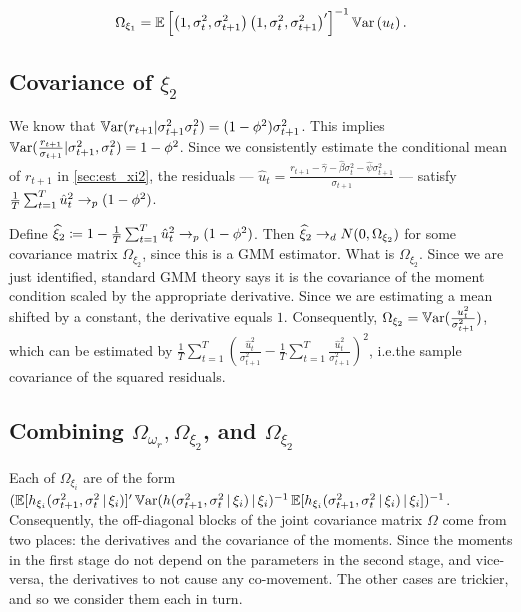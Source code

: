 \documentclass[11pt, letterpaper, twoside]{article}
\begin{document}
\begin{equation}
  \Omega_{\xi_1} = \operatorname{\mathbb{E}}\left[\left(1, \sigma^2_{t}, \sigma^2_{t+1}\right) \left(1, \sigma^2_{t},
  \sigma^2_{t+1}\right)'\right]^{-1} \operatorname{\mathbb{V}ar}\left(u_t\right).
\end{equation}


\subsection[Covariance Computation Step 3]{Covariance of $\xi_2$}

We know that $\operatorname{\mathbb{V}ar}(r_{t+1} \vert \sigma^2_{t+1} \sigma^2_t) = (1-\phi^2) \sigma^2_{t+1}$.
This implies $\operatorname{\mathbb{V}ar}(\frac{r_{t+1}}{\sigma_{t+1}} \vert \sigma^2_{t+1}, \sigma^2_t) = 1 - \phi^2$.
Since we consistently estimate the conditional mean of $r_{t+1}$ in \cref{sec:est_xi2}, the residuals ---
$\widehat{u}_t = \frac{r_{t+1} - \widehat{\gamma} - \widehat{\beta}\sigma^2_t - \widehat{\psi}
\sigma^2_{t+1}}{\sigma_{t+1}}$ --- satisfy $\frac{1}{T} \sum_{t=1}^T \hat{u}_t^2 \to_p (1 - \phi^2)$.

Define $\widehat{\xi}_2 \coloneqq 1 - \frac{1}{T} \sum_{t=1}^T \hat{u}_t^2 \to_p (1 - \phi^2)$.
Then $\widehat{\xi}_2 \to_d N(0, \Omega_{\xi_2})$ for some covariance matrix $\Omega_{\xi_2}$, since this is a GMM
estimator.
What is $\Omega_{\xi_2}$.
Since we are just identified, standard GMM theory says it is the covariance of the moment condition scaled by the
appropriate derivative. 
Since we are estimating a mean shifted by a constant, the derivative equals $1$.
Consequently, $\Omega_{\xi_2} = \operatorname{\mathbb{V}ar}(\frac{u^2_t}{\sigma^2_{t+1}})$, which can be estimated by
$\frac{1}{T} \sum_{t=1}^T (\frac{\widehat{u}_t^2}{\sigma^2_{t+1}} - \frac{1}{T} \sum_{t=1}^T
\frac{\widehat{u}_t^2}{\sigma^2_{t+1}})^2$, i.e.\@ the sample covariance of the squared residuals. 

\subsection[Combining the Covariance Matrices]{Combining $\Omega_{\omega_r}, \Omega_{\xi_2}$, and $\Omega_{\xi_2}$}

Each of $\Omega_{\xi_i}$ are of the form $(\operatorname{\mathbb{E}}[h_{\xi_{i}}(\sigma^2_{t+1}, \sigma^2_t \,\vert\, \xi_i)]' \operatorname{\mathbb{V}ar}(h(\sigma^2_{t+1}, \sigma^2_t \,\vert\, \xi_i) \,\vert\, \xi_i)^{-1} \operatorname{\mathbb{E}}[h_{\xi_{i}}(\sigma^2_{t+1}, \sigma^2_t \,\vert\, \xi_i) \,\vert\, \xi_i])^{-1}$. Consequently, the off-diagonal blocks of the joint covariance matrix $\Omega$ come from two places: the derivatives and the covariance of the moments. Since the moments in the first stage do not depend on the parameters in the second stage, and vice-versa, the derivatives to not cause any co-movement. The other cases are trickier, and so we consider them each in turn. 
\end{document}
